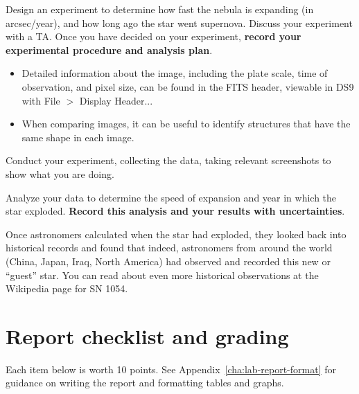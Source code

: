 \begin{steps}
	\item Design an experiment to determine how fast the nebula is expanding (in arcsec/year), and how long ago the star went supernova. Discuss your experiment with a TA. Once you have decided on your experiment, \textbf{record your experimental procedure and analysis plan}.
	\begin{itemize}
		\item Detailed information about the image, including the plate scale, time of observation, and pixel size, can be found in the FITS header, viewable in DS9 with File $>$ Display Header...
		
		\item When comparing images, it can be useful to identify structures that have the same shape in each image.
	\end{itemize}
	
	\item Conduct your experiment, collecting the data, taking relevant screenshots to show what you are doing.
	
	\item Analyze your data to determine the speed of expansion and year in which the star exploded. \textbf{Record this analysis and your results with uncertainties}.
\end{steps}

Once astronomers calculated when the star had exploded, they looked back into historical records and found that indeed, astronomers from around the world (China, Japan, Iraq, North America) had observed and recorded this new or ``guest'' star. You can read about even more historical observations at the Wikipedia page for SN 1054.

\section{Report checklist and grading}

Each item below is worth 10 points. See Appendix\ \ref{cha:lab-report-format} for guidance on writing the report and formatting tables and graphs.

